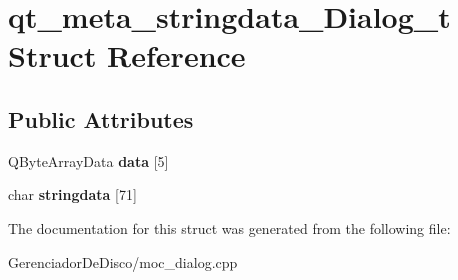 \hypertarget{structqt__meta__stringdata__Dialog__t}{\section{qt\+\_\+meta\+\_\+stringdata\+\_\+\+Dialog\+\_\+t Struct Reference}
\label{structqt__meta__stringdata__Dialog__t}
}
\subsection*{Public Attributes}
\begin{DoxyCompactItemize}
\item 
\hypertarget{structqt__meta__stringdata__Dialog__t_ae8df3bc8b623c73ab4d9b75541fe0ed8}{Q\+Byte\+Array\+Data {\bfseries data} \mbox{[}5\mbox{]}}\label{structqt__meta__stringdata__Dialog__t_ae8df3bc8b623c73ab4d9b75541fe0ed8}

\item 
\hypertarget{structqt__meta__stringdata__Dialog__t_aa3d88739476830b302bbe2887068499e}{char {\bfseries stringdata} \mbox{[}71\mbox{]}}\label{structqt__meta__stringdata__Dialog__t_aa3d88739476830b302bbe2887068499e}

\end{DoxyCompactItemize}


The documentation for this struct was generated from the following file\+:\begin{DoxyCompactItemize}
\item 
Gerenciador\+De\+Disco/moc\+\_\+dialog.\+cpp\end{DoxyCompactItemize}
